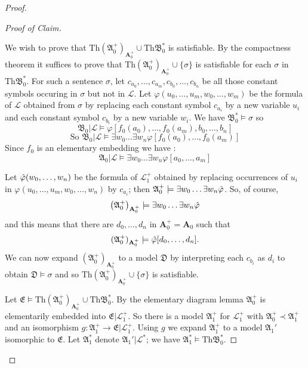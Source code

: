 \documentclass[titlepage, oneside]{amsbook}
\theoremstyle{plain}
\theoremstyle{definition}
\theoremstyle{remark}
\newcommand{\Th}{\ensuremath{\mbox{Th}}}
\newcommand{\lan}{\ensuremath{\mathcal{L}}}
\newcommand{\ma}{\ensuremath{\mathfrak{A}}}
\newcommand{\mb}{\ensuremath{\mathfrak{B}}}
\newcommand{\md}{\ensuremath{\mathfrak{D}}}
\newcommand{\me}{\ensuremath{\mathfrak{E}}}
\newcommand{\ba}{\ensuremath{\mathbf{A}}}
\newcommand{\bb}{\ensuremath{\mathbf{B}}}
\newcommand{\exw}[2][0]{\ensuremath{\exists w_{#1}  \dots  \exists
w_{#2}}}
\newcommand{\anot}[2][0]{\ensuremath{ a_{#1} , \dots , a_{#2}}}
\newcommand{\dnot}[2][0]{\ensuremath{ d_{#1} , \dots , d_{#2}}}
\newcommand{\unot}[2][0]{\ensuremath{ u_{#1} , \dots , u_{#2}}}
\newcommand{\wnot}[2][0]{\ensuremath{ w_{#1} , \dots , w_{#2}}}
\newcommand{\hphi}{\ensuremath{\Hat{\varphi}}}
\begin{document}
\begin{proof}
\begin{proof}[Proof of Claim]
$  $\par
We wish to prove that $\Th \left( \ma_0^+ \right)_{\ba_0^+} \cup \Th
\mb_0^{\ast} $ is satisfiable. By the compactness theorem it
suffices to prove that $\Th \left( \ma_0^+ \right)_{\ba_0^+} \cup \{
\sigma \} $ is
satisfiable for each $\sigma $ in $\Th \mb_0^{\ast}$. For such a
sentence
$\sigma $, let $c_{a_0}, \dots , c_{a_m} , c_{b_0} , \dots , c_{b_n} $ be
all those constant symbols occuring in $\sigma $ but not
in $\lan $.
Let $\varphi ( u_0 , \dots , u_m , w_0 , \dots , w_m ) $ be the formula of
$\lan $ obtained from $\sigma $ by replacing each constant
symbol $c_{a_i} $ by a new variable $u_i $ and each constant symbol
$c_{b_i} $ by
a
new
variable $w_i $.  We have $\mb_0^{\ast} \models \sigma $ so 
\[\mb_0 |\lan \models \varphi [ f_0 (a_0) ,\dots , f_0 ( a_m ), b_0
,
\dots , b_n ] \]
\[\mbox{So }\mb_0 |\lan \models \exw{n} \varphi [ f_0 (a_0) , \dots ,
f_0 ( a_m ) ] \]
Since $f_0 $ is an elementary embedding we have :
\[ \ma_0 |\lan \models \exw{n} \varphi [ \anot m ] \]

\newcommand{\crap}{\ensuremath{\left( \ma_{0}^{+} \right)_{\ba_{0}^{+}}
}}

Let $\hphi ( \wnot{n})$ be the formula of $\lan_{1}^{+}$ obtained by
replacing occurrences of $u_i$ in $\varphi ( \unot m , \wnot n ) $ by
$c_{a_i}$; then $\ma_{0}^{+} \models \exw{n} \hphi$. So, of course, \[
\left( \ma_{0}^{+} \right)_{\ba_{0}^{+}} \models \exw{n} \hphi \]  and 
this means that there are $\dnot n$ in $\ba_0^+ = \ba_0$ such that 
\[ (\ma_0^+ )_{\ba_0^+} \models \hphi [ \dnot n ] .\] We
can now expand $\crap$ to a model $\md$ by interpreting each
$c_{b_i}$ as $d_i$ to obtain $\md \models \sigma$ and so $\Th \crap \cup
\{ \sigma \} $ is satisfiable.


Let $\me \models \Th \crap \cup \Th \mb_{0}^{\ast}$.  By the elementary
diagram lemma $\ma_0^+$ is elementarily embedded into $\me
|{\lan_{1}^{+}}$.  So there is a model $\ma_1^+$ for $\lan_1^+$
with
$\ma_0^+ \prec \ma_1^+$ and an isomorphism $g: \ma_1^+ \to \me
| {\lan_1^+}$.  Using $g$ we expand $\ma_1^+$ to a model $\ma_1'$
isomorphic to $\me$.  Let $\ma_1^{\ast}$ denote $\ma_1'
| {\lan^{\ast}}$; we have $\ma_1^{\ast} \models \Th \mb_0^{\ast}$.

\newcommand{\sucks}{\ensuremath{\left( \ma_1^{\ast}
\right)_{\ba_1^{\ast}}}}
\newcommand{\bobo}{\ensuremath{ \left( \mb_0^+ \right)_{\bb^+_0 }  }}
\newcommand{\bo}{\ensuremath{ \mb_0}}
\newcommand{\bostar}{\ensuremath{ \mb_0^{\ast}}}
\newcommand{\bop}{\ensuremath{ \mb_0^+}}


\end{proof}
\end{proof}
\end{document}
